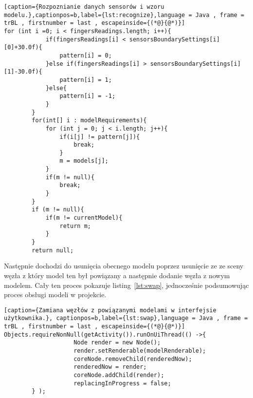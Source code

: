 \begin{lstlisting}[caption={Rozpoznianie danych sensorów i wzoru modelu.},captionpos=b,label={lst:recognize},language = Java , frame = trBL , firstnumber = last , escapeinside={(*@}{@*)}]     
for (int i =0; i < fingersReadings.length; i++){
            if(fingersReadings[i] < sensorsBoundarySettings[i][0]+30.0f){
                pattern[i] = 0;
            }else if(fingersReadings[i] > sensorsBoundarySettings[i][1]-30.0f){
                pattern[i] = 1;
            }else{
                pattern[i] = -1;
            }
        }   
        for(int[] i : modelRequirements){
            for (int j = 0; j < i.length; j++){
                if(i[j] != pattern[j]){
                    break;
                }
                m = models[j];
            }
            if(m != null){
                break;
            }
        }
        if (m != null){
            if(m != currentModel){
                return m;
            }
        }
        return null;                                                        
\end{lstlisting}	
Następnie dochodzi do usunięcia obecnego modelu poprzez usunięcie ze ze sceny węzła z który model ten był powiązany a następnie dodanie węzła z nowym modelem. Cały ten proces pokazuje listing~\ref{lst:swap}, jednocześnie podsumowując proces obsługi modeli w projekcie. \newpage
\begin{lstlisting}[caption={Zamiana węzłów z powiązanymi modelami w interfejsie użytkownika.}, captionpos=b,label={lst:swap},language = Java , frame = trBL , firstnumber = last , escapeinside={(*@}{@*)}]     
Objects.requireNonNull(getActivity()).runOnUiThread(() ->{
                    Node render = new Node();
                    render.setRenderable(modelRenderable);
                    coreNode.removeChild(renderedNow);
                    renderedNow = render;
                    coreNode.addChild(render);
                    replacingInProgress = false;
        } );                                                      
\end{lstlisting}

